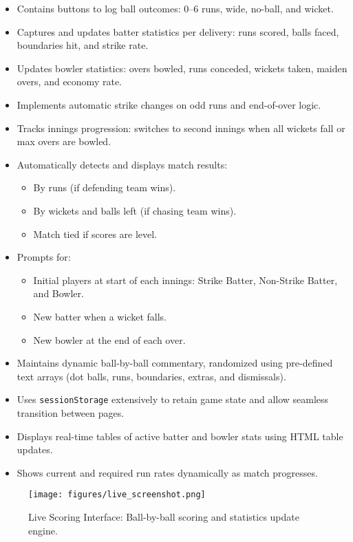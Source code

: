 \documentclass[a4paper,10pt]{article}
\begin{document}
\begin{itemize}
    \item Contains buttons to log ball outcomes: 0–6 runs, wide, no-ball, and wicket.
    \item Captures and updates batter statistics per delivery: runs scored, balls faced, boundaries hit, and strike rate.
    \item Updates bowler statistics: overs bowled, runs conceded, wickets taken, maiden overs, and economy rate.
    \item Implements automatic strike changes on odd runs and end-of-over logic.
    \item Tracks innings progression: switches to second innings when all wickets fall or max overs are bowled.
    \item Automatically detects and displays match results:
    \begin{itemize}
        \item By runs (if defending team wins).
        \item By wickets and balls left (if chasing team wins).
        \item Match tied if scores are level.
    \end{itemize}
    \item Prompts for:
    \begin{itemize}
        \item Initial players at start of each innings: Strike Batter, Non-Strike Batter, and Bowler.
        \item New batter when a wicket falls.
        \item New bowler at the end of each over.
    \end{itemize}
    \item Maintains dynamic ball-by-ball commentary, randomized using pre-defined text arrays (dot balls, runs, boundaries, extras, and dismissals).
    \item Uses \texttt{sessionStorage} extensively to retain game state and allow seamless transition between pages.
    \item Displays real-time tables of active batter and bowler stats using HTML table updates.
    \item Shows current and required run rates dynamically as match progresses.
\end{itemize}

\begin{figure}[H]
    \centering
    \texttt{[image: figures/live\_screenshot.png]}
    \caption{Live Scoring Interface: Ball-by-ball scoring and statistics update engine.}
    \label{fig:live}
\end{figure}
\end{document}
